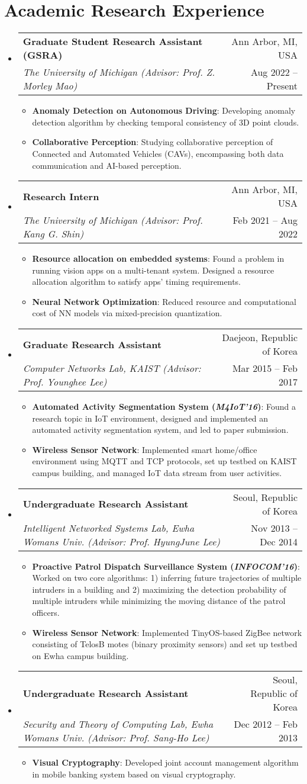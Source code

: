 \documentclass[letterpaper,oneside,11pt]{article}
\makeatletter
\newcommand{\resumeItem}[2]{
  \item\small{
    \textbf{#1}{: #2 \vspace{-2pt}}
  }
}
\newcommand{\resumeSubheading}[4]{
  \vspace{-2pt}\item
    \begin{tabularx}{0.97\textwidth}[t]{X@{\hspace{-5pt}}r}
      \textbf{#1} & #2 \\
      \textit{\small#3} & \small #4 \\
    \end{tabularx}\vspace{-6pt}
}
\newcommand{\resumeSubHeadingListStart}{\begin{itemize}[leftmargin=*]}
\newcommand{\resumeSubHeadingListEnd}{\end{itemize}}
\newcommand{\resumeItemListStart}{\begin{itemize}}
\newcommand{\resumeItemListEnd}{\end{itemize}\vspace{-5pt}}
\makeatother
\begin{document}
\section{Academic Research Experience}
  \resumeSubHeadingListStart
    \resumeSubheading
    {Graduate Student Research Assistant (GSRA)}{Ann Arbor, MI, USA}
    {The University of Michigan (Advisor: Prof. Z. Morley Mao)}{Aug 2022 -- Present}
    \resumeItemListStart
      \resumeItem{Anomaly Detection on Autonomous Driving}{Developing anomaly detection algorithm by checking temporal consistency of 3D point clouds.}
      \resumeItem{Collaborative Perception}{Studying collaborative perception of Connected and Automated Vehicles (CAVs), encompassing both data communication and AI-based perception.}
    \resumeItemListEnd
    \resumeSubheading
      {Research Intern}{Ann Arbor, MI, USA}
      {The University of Michigan (Advisor: Prof. Kang G. Shin)}{Feb 2021 -- Aug 2022}
      \resumeItemListStart
        \resumeItem{Resource allocation on embedded systems}{Found a problem in running vision apps on a multi-tenant system. Designed a resource allocation algorithm to satisfy apps' timing requirements.}
        \resumeItem{Neural Network Optimization}{Reduced resource and computational cost of NN models via mixed-precision quantization.}
      \resumeItemListEnd
    \resumeSubheading
      {Graduate Research Assistant}{Daejeon, Republic of Korea}
      {Computer Networks Lab, KAIST (Advisor: Prof. Younghee Lee)}{Mar 2015 -- Feb 2017}
      \resumeItemListStart
        \resumeItem{Automated Activity Segmentation System (\textit{\textbf{M4IoT'16}})}{Found a research topic in IoT environment, designed and implemented an automated activity segmentation system, and led to paper submission.}
        \resumeItem{Wireless Sensor Network}{Implemented smart home/office environment using MQTT and TCP protocols, set up testbed on KAIST campus building, and managed IoT data stream from user activities.}
      \resumeItemListEnd
    \resumeSubheading
      {Undergraduate Research Assistant}{Seoul, Republic of Korea}
      {Intelligent Networked Systems Lab, Ewha Womans Univ. (Advisor: Prof. HyungJune Lee)}{Nov 2013 -- Dec 2014}
      \resumeItemListStart   
        \resumeItem{Proactive Patrol Dispatch Surveillance System (\textit{\textbf{INFOCOM'16}})}{Worked on two core algorithms: 1) inferring future trajectories of multiple intruders in a building and 2) maximizing the detection probability of multiple intruders while minimizing the moving distance of the patrol officers.}
        \resumeItem{Wireless Sensor Network}{Implemented TinyOS-based ZigBee network consisting of TelosB motes (binary proximity sensors) and set up testbed on Ewha campus building.}
      \resumeItemListEnd
    \resumeSubheading
      {Undergraduate Research Assistant}{Seoul, Republic of Korea}
      {Security and Theory of Computing Lab, Ewha Womans Univ. (Advisor: Prof. Sang-Ho Lee)}{Dec 2012 -- Feb 2013}
      \resumeItemListStart
        \resumeItem{Visual Cryptography}{Developed joint account management algorithm in mobile banking system based on visual cryptography.}
      \resumeItemListEnd
  \resumeSubHeadingListEnd
\end{document}
